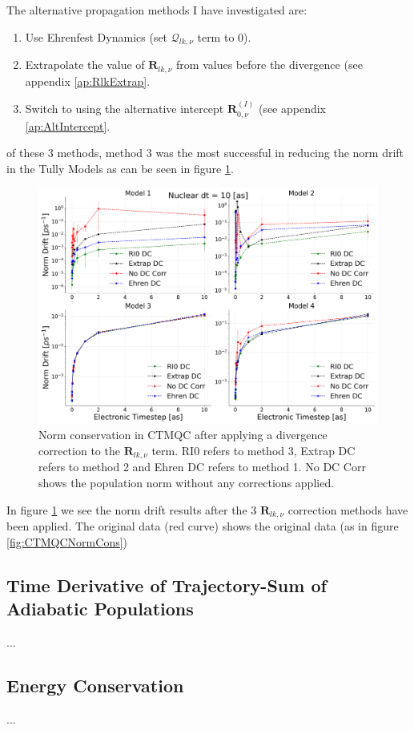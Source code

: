\clearpage
\noindent The alternative propagation methods I have investigated are:
\begin{enumerate}
	\item Use Ehrenfest Dynamics (set $\mathcal{Q}_{lk, \nu}$ term to 0).
	\item Extrapolate the value of $\mathbf{R}_{lk, \nu}$ from values before the divergence (see appendix \ref{ap:RlkExtrap}.
	\item Switch to using the alternative intercept $\mathbf{R}_{0, \nu}^{(I)}$ (see appendix \ref{ap:AltIntercept}.
\end{enumerate}
of these 3 methods, method 3 was the most successful in reducing the norm drift in the Tully Models as can be seen in figure \ref{fig:NormConsCorr}.
\begin{figure}[h]
	\includegraphics[width=\textwidth]{img/CTMQC/TullyModels/CTMQC_Norm_Conservation_wCorr.png}
	\caption{\label{fig:NormConsCorr}Norm conservation in CTMQC after applying a divergence correction to the $\mathbf{R}_{lk, \nu}$ term. RI0 refers to method 3, Extrap DC refers to method 2 and Ehren DC refers to method 1. No DC Corr shows the population norm without any corrections applied.}
\end{figure}
In figure \ref{fig:NormConsCorr} we see the norm drift results after the 3 $\mathbf{R}_{lk, \nu}$ correction methods have been applied. The original data (red curve) shows the original data (as in figure \ref{fig:CTMQCNormCons})



\subsection{Time Derivative of Trajectory-Sum of Adiabatic Populations}
...
\subsection{Energy Conservation}
...
